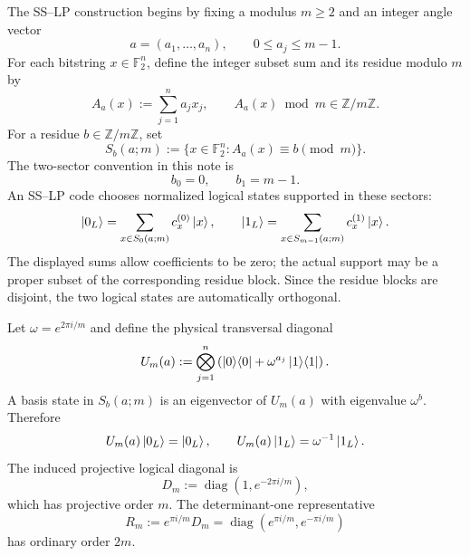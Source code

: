 \documentclass[11pt]{article}
\newcommand{\F}{\mathbb F}
\newcommand{\Z}{\mathbb Z}
\newcommand{\diag}{\operatorname{diag}}
\begin{document}
The SS--LP construction begins by fixing a modulus $m\ge2$ and an integer angle vector~\cite{ZhangWuHuangZeng2025}
\[
  a=(a_1,\ldots,a_n),\qquad 0\le a_j\le m-1.
\]
For each bitstring $x\in\F_2^n$, define the integer subset sum and its residue modulo $m$ by
\begin{equation}
  A_a(x):=\sum_{j=1}^n a_jx_j,
  \qquad
  A_a(x)\bmod m\in\Z/m\Z .
  \label{eq:subset-sum}
\end{equation}
For a residue $b\in\Z/m\Z$, set
\begin{equation}
  S_b(a;m):=\{x\in\F_2^n: A_a(x)\equiv b\pmod m\}.
  \label{eq:subset-sum-block}
\end{equation}
The two-sector convention in this note is
\begin{equation}
  b_0=0,
  \qquad
  b_1=m-1.
  \label{eq:k2-residues}
\end{equation}
An SS--LP code chooses normalized logical states supported in these sectors:
\begin{equation}
  \ket{0_L}=\sum_{x\in S_0(a;m)} c^{(0)}_x\ket{x},
  \qquad
  \ket{1_L}=\sum_{x\in S_{m-1}(a;m)} c^{(1)}_x\ket{x}.
  \label{eq:sslp-codewords}
\end{equation}
The displayed sums allow coefficients to be zero; the actual support may be a proper subset of
the corresponding residue block.  Since the residue blocks are disjoint, the two logical states
are automatically orthogonal.

Let $\omega=e^{2\pi i/m}$ and define the physical transversal diagonal
\begin{equation}
  U_m(a):=\bigotimes_{j=1}^n
  \left(\ket{0}\!\bra{0}+\omega^{a_j}\ket{1}\!\bra{1}\right).
  \label{eq:sslp-physical-diagonal}
\end{equation}
A basis state in $S_b(a;m)$ is an eigenvector of $U_m(a)$ with eigenvalue $\omega^b$.  Therefore
\begin{equation}
  U_m(a)\ket{0_L}=\ket{0_L},
  \qquad
  U_m(a)\ket{1_L}=\omega^{-1}\ket{1_L}.
  \label{eq:sslp-logical-diagonal}
\end{equation}
The induced projective logical diagonal is
\begin{equation}
  D_m:=\diag(1,e^{-2\pi i/m}),
  \label{eq:Dm-def}
\end{equation}
which has projective order $m$.  The determinant-one representative
\begin{equation}
  R_m:=e^{\pi i/m}D_m=\diag(e^{\pi i/m},e^{-\pi i/m})
  \label{eq:Rm-def}
\end{equation}
has ordinary order $2m$.
\end{document}
